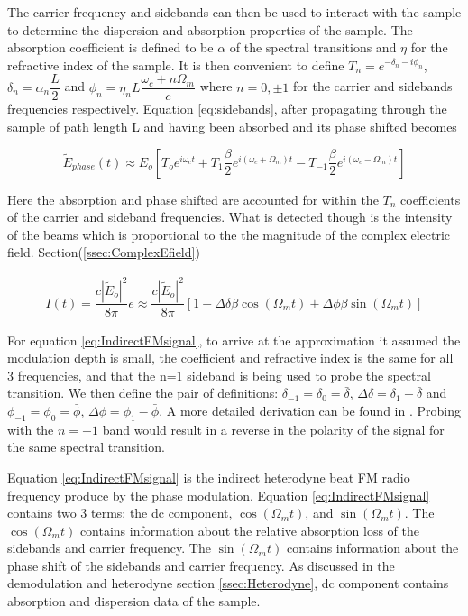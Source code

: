 \documentclass[a4paper]{book}
\begin{document}
The carrier frequency and sidebands can then be used to interact with the sample to determine the dispersion and absorption properties of the sample. The absorption coefficient is defined to be $\alpha$ of the spectral transitions and $\eta$ for the refractive index of the sample. It is then convenient to define $T_n=e^{-\delta_n -i \phi_n}$, $\delta_n=\alpha_n \dfrac{L}{2}$ and $\phi_n=\eta_n L\dfrac{\omega_c + n\Omega_m}{c}$ where $n=0,\pm1$ for the carrier and sidebands frequencies respectively. Equation \ref{eq:sidebands}, after propagating through the sample of path length L and having been absorbed and its phase shifted becomes

\begin{equation}
\tilde{E}_{phase}(t)\approx E_o [T_o e^{i\omega_c t}   +   T_1 \dfrac{\beta}{2} e^{i(\omega_c +\Omega_m)t}  -  T_{-1} \dfrac{\beta}{2} e^{i(\omega_c -\Omega_m)t}]
\end{equation}

Here the absorption and phase shifted are accounted for within the $T_n$ coefficients of the carrier and sideband frequencies. What is detected though is the intensity of the beams which is proportional to the the magnitude of the complex electric field. Section(\ref{ssec:ComplexEfield})

\begin{equation}
\label{eq:IndirectFMsignal}
\begin{split}
I(t) = \dfrac{c|\tilde{E}_o|^2}{8\pi} e \approx \dfrac{c|\tilde{E}_o|^2}{8\pi}[1-\Delta\delta\beta \cos{(\Omega_m t)+\Delta\phi\beta\sin{(\Omega_m t)}}]
\end{split}
\end{equation}

For equation \ref{eq:IndirectFMsignal}, to arrive at the approximation it assumed the modulation depth is small, the coefficient and refractive index is the same for all 3 frequencies, and that the n=1 sideband is being used to probe the spectral transition. We then define the pair of definitions: $\delta_{-1}=\delta_0=\bar{\delta}$, $\Delta\delta = \delta_1 -\bar{\delta}$ and $\phi_{-1}=\phi_0=\bar{\phi}$, $\Delta\phi = \phi_1 -\bar{\phi}$. A more detailed derivation can be found in \cite{FMspec}. Probing with the $n=-1$ band would result in a reverse in the polarity of the signal for the same spectral transition.

Equation \ref{eq:IndirectFMsignal} is the indirect heterodyne beat FM radio frequency produce by the phase modulation. Equation \ref{eq:IndirectFMsignal} contains two 3 terms: the dc component, $\cos{(\Omega_m t)}$, and $\sin{(\Omega_m t)}$. The $\cos{(\Omega_m t)}$ contains information about the relative absorption loss of the sidebands and carrier frequency. The $\sin{(\Omega_m t)}$ contains information about the phase shift of the sidebands and carrier frequency. As discussed in the demodulation and heterodyne section \ref{ssec:Heterodyne}, dc component contains absorption and dispersion data of the sample.
\end{document}
